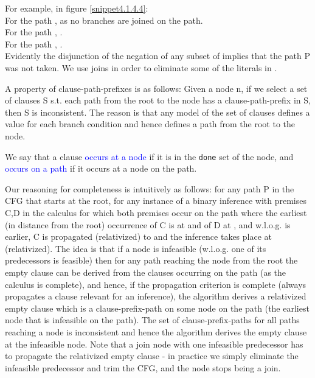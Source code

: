 For example, in figure \ref{snippet4.1.4.4}:\\
For the path ,  as no branches are joined on the path.\\
For the path , .\\
For the path , .\\
Evidently the disjunction of the negation of any subset of  implies that the path P was not taken.
We use joins in order to eliminate some of the literals in .

A property of clause-path-prefixes is as follows:
Given a node n, if we select a set of clauses S s.t. each path from the root to the node has a clause-path-prefix in S, then S is inconsistent.
The reason is that any model of the set of clauses defines a value for each branch condition and hence defines a path from the root to the node.

\bigskip
We say that a clause \textcolor{blue}{occurs at a node} if it is in the \lstinline|done| set of the node, and \textcolor{blue}{occurs on a path} if it occurs at a node on the path.

\bigskip
Our reasoning for completeness is intuitively as follows: for any path P in the CFG that starts at the root, 
for any instance of a binary inference with premises C,D in the calculus for which both premises occur on the path where the earliest (in distance from the root) occurrence of C is at  and of D at , and w.l.o.g.  is earlier, C is propagated (relativized) to  and the inference takes place at  (relativized).
The idea is that if a node is infeasible (w.l.o.g. one of its predecessors is feasible) then for any path reaching the node from the root the empty clause can be derived from the clauses occurring on the path (as the calculus is complete), and hence, if the propagation criterion is complete (always propagates a clause relevant for an inference), the algorithm derives a relativized empty clause which is a clause-prefix-path on some node on the path (the earliest node that is infeasible on the path). The set of clause-prefix-paths for all paths reaching a node is inconsistent and hence the algorithm derives the empty clause at the infeasible node. Note that a join node with one infeasible predecessor has to propagate the relativized empty clause - in practice we simply eliminate the infeasible predecessor and trim the CFG, and the node stops being a join.

